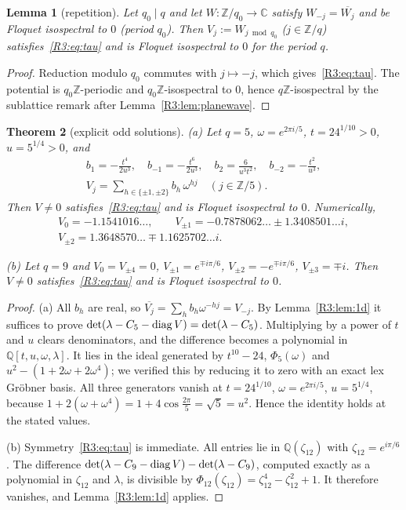 \documentclass[11pt]{amsart}
\newtheorem{theorem}{Theorem}[section]
\newtheorem{lemma}[theorem]{Lemma}
\theoremstyle{definition}
\theoremstyle{remark}
\providecommand{\C}{\mathbb C}
\providecommand{\Q}{\mathbb Q}
\providecommand{\Z}{\mathbb Z}
\begin{document}
\begin{lemma}[repetition]\label{R3:lem:repeat}
Let $q_0\mid q$ and let $W:\Z/q_0\to\C$ satisfy $W_{-j}=\overline{W_j}$ and be Floquet
isospectral to $0$ (period $q_0$). Then $V_j:=W_{j\bmod q_0}$ ($j\in\Z/q$)
satisfies~\eqref{R3:eq:tau} and is Floquet isospectral to $0$ for the period $q$.
\end{lemma}

\begin{proof}
Reduction modulo $q_0$ commutes with $j\mapsto-j$, which gives~\eqref{R3:eq:tau}.
The potential is $q_0\Z$-periodic and $q_0\Z$-isospectral to $0$, hence
$q\Z$-isospectral by the sublattice remark after Lemma~\ref{R3:lem:planewave}.
\end{proof}

\begin{theorem}[explicit odd solutions]\label{R3:thm:explicit}
\textup{(a)} Let $q=5$, $\omega=e^{2\pi i/5}$, $t=24^{1/10}>0$, $u=5^{1/4}>0$, and
\begin{gather*}
 b_{1}=-\frac{t^4}{2u^3},\quad b_{-1}=-\frac{t^6}{2u^3},\quad
 b_{2}=\frac{6}{u^3t^2},\quad b_{-2}=-\frac{t^2}{u^3},\\
 V_j=\sum_{h\in\{\pm1,\pm2\}}b_h\,\omega^{hj}\quad(j\in\Z/5).
\end{gather*}
Then $V\ne0$ satisfies~\eqref{R3:eq:tau} and is Floquet isospectral to $0$.
Numerically,
\begin{gather*}
 V_0=-1.1541016\ldots,\qquad V_{\pm1}=-0.7878062\ldots\pm1.3408501\ldots i,\\
 V_{\pm2}=1.3648570\ldots\mp1.1625702\ldots i.
\end{gather*}

\textup{(b)} Let $q=9$ and $V_0=V_{\pm4}=0$, $V_{\pm1}=e^{\mp i\pi/6}$,
$V_{\pm2}=-e^{\mp i\pi/6}$, $V_{\pm3}=\mp i$. Then $V\neq0$
satisfies~\eqref{R3:eq:tau} and is Floquet isospectral to $0$.
\end{theorem}

\begin{proof}
(a) All $b_h$ are real, so $\overline{V_j}=\sum_hb_h\omega^{-hj}=V_{-j}$. By
Lemma~\ref{R3:lem:1d} it suffices to prove
$\det(\lambda-C_5-\operatorname{diag} V)=\det(\lambda-C_5)$. Multiplying by a power of $t$ and
$u$ clears denominators, and the difference becomes a polynomial in
$\Q[t,u,\omega,\lambda]$. It lies in the ideal generated by $t^{10}-24$,
$\Phi_5(\omega)$ and $u^2-(1+2\omega+2\omega^4)$; we verified this by reducing
it to zero with an exact lex Gr\"obner basis. All three generators vanish at
$t=24^{1/10}$, $\omega=e^{2\pi i/5}$, $u=5^{1/4}$, because
$1+2(\omega+\omega^4)=1+4\cos\frac{2\pi}5=\sqrt5=u^2$. Hence the identity holds
at the stated values.

(b) Symmetry~\eqref{R3:eq:tau} is immediate. All entries lie in
$\Q(\zeta_{12})$ with $\zeta_{12}=e^{i\pi/6}$. The difference
$\det(\lambda-C_9-\operatorname{diag} V)-\det(\lambda-C_9)$, computed exactly as a polynomial in
$\zeta_{12}$ and $\lambda$, is divisible by $\Phi_{12}(\zeta_{12})=\zeta_{12}^4-\zeta_{12}^2+1$.
It therefore vanishes, and Lemma~\ref{R3:lem:1d} applies.
\end{proof}
\end{document}
